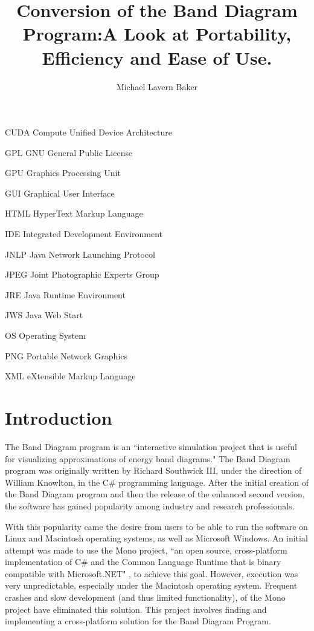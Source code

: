 \documentclass[project]{bsu-ms}
\title{Conversion of the Band Diagram Program:\titleBreak A Look at Portability, Efficiency and Ease of Use.}
\author{Michael Lavern Baker}
\begin{document}
\frontmatter
\buildFrontPages

\begin{listAbbreviations}
\item[CUDA] Compute Unified Device Architecture
\item[GPL] GNU General Public License
\item[GPU] Graphics Processing Unit
\item[GUI] Graphical User Interface
\item[HTML] HyperText Markup Language
\item[IDE] Integrated Development Environment
\item[JNLP] Java Network Launching Protocol
\item[JPEG] Joint Photographic Experts Group
\item[JRE] Java Runtime Environment
\item[JWS] Java Web Start
\item[OS] Operating System
\item[PNG] Portable Network Graphics
\item[XML] eXtensible Markup Language
\end{listAbbreviations}

\mainmatter

%
%
\chapter{Introduction}\label{ch:intro}

The Band Diagram program is an ``interactive simulation project that is useful for visualizing approximations of energy band diagrams." \cite{band:web1} The Band Diagram program was originally written by Richard Southwick III, under the direction of William Knowlton, in the C\# programming language. After the initial creation of the Band Diagram program and then the release of the enhanced second version, the software has gained popularity among industry and research professionals. 

With this popularity came the desire from users to be able to run the software on Linux and Macintosh operating systems, as well as Microsoft Windows. An initial attempt was made to use the Mono project, ``an open source, cross-platform implementation of C\# and the Common Language Runtime that is binary compatible with Microsoft.NET" \cite{band:web2}, to achieve this goal. However, execution was very unpredictable, especially under the Macintosh operating system. Frequent crashes and slow development (and thus limited functionality), of the Mono project have eliminated this solution. This project involves finding and implementing a cross-platform solution for the Band Diagram Program.
\end{document}
